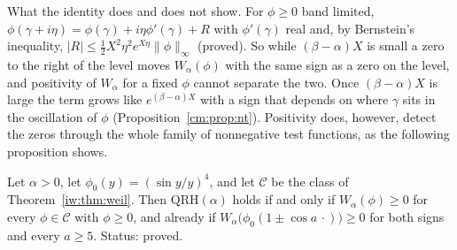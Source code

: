 What the identity does and does not show. For $\phi\ge0$ band limited, $\phi(\gamma+i\eta)=\phi(\gamma)+i\eta\phi'(\gamma)+R$ with $\phi'(\gamma)$ real and, by Bernstein's inequality, $|R|\le\frac12X^2\eta^2e^{X\eta}\|\phi\|_\infty$ (proved). So while $(\beta-\alpha)X$ is small a zero to the right of the level moves $W_\alpha(\phi)$ with the same sign as a zero on the level, and positivity of $W_\alpha$ for a fixed $\phi$ cannot separate the two. Once $(\beta-\alpha)X$ is large the term grows like $e^{(\beta-\alpha)X}$ with a sign that depends on where $\gamma$ sits in the oscillation of $\phi$ (Proposition~\ref{cm:prop:nt}). Positivity does, however, detect the zeros through the whole family of nonnegative test functions, as the following proposition shows.

\begin{proposition}\label{iw:prop:converse}
Let $\alpha>0$, let $\phi_0(y)=(\sin y/y)^4$, and let $\mathcal C$ be the class of Theorem~\ref{iw:thm:weil}. Then $\mathrm{QRH}(\alpha)$ holds if and only if $W_\alpha(\phi)\ge0$ for every $\phi\in\mathcal C$ with $\phi\ge0$, and already if $W_\alpha\big(\phi_0(1\pm\cos a\,\cdot)\big)\ge0$ for both signs and every $a\ge5$. Status: proved.
\end{proposition}

